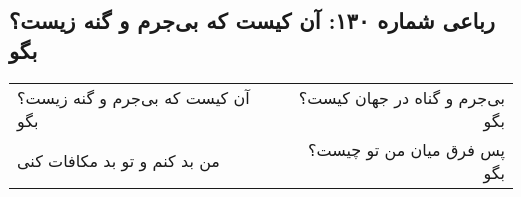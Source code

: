 \begin{center}
\section*{رباعی شماره ۱۳۰: آن کیست که بی‌جرم و گنه زیست؟ بگو}
\label{sec:130}
\begin{longtable}{l p{0.5cm} r}
آن کیست که بی‌جرم و گنه زیست؟ بگو
&&
بی‌جرم و گناه در جهان کیست؟ بگو
\\
من بد کنم و تو بد مکافات کنی
&&
پس فرق میان من تو چیست؟ بگو
\\
\end{longtable}
\end{center}
